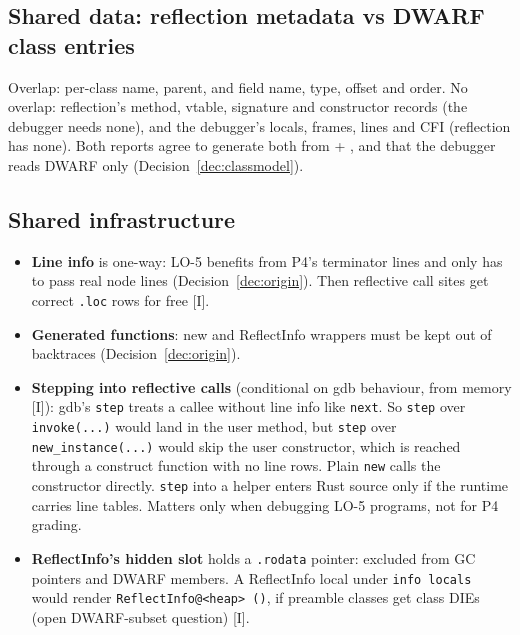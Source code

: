 \documentclass[10pt]{article}
\newcommand{\code}[1]{\texttt{\small #1}}
\newcommand{\mI}{\textsf{\scriptsize[I]}}
\begin{document}
\subsection{Shared data: reflection metadata vs DWARF class entries}\label{sec:ov-data}
Overlap: per-class name, parent, and field name, type, offset and order. No overlap: reflection's method, vtable, signature and constructor records (the debugger needs none), and the debugger's locals, frames, lines and CFI (reflection has none). Both reports agree to generate both from  + , and that the debugger reads DWARF only (Decision~\ref{dec:classmodel}).

\subsection{Shared infrastructure}\label{sec:ov-infra}
\begin{itemize}
\item \textbf{Line info} is one-way: LO-5 benefits from P4's terminator lines and only has to pass real node lines (Decision~\ref{dec:origin}). Then reflective call sites get correct \code{.loc} rows for free \mI.
\item \textbf{Generated functions}: new  and ReflectInfo wrappers must be kept out of backtraces (Decision~\ref{dec:origin}).
\item \textbf{Stepping into reflective calls} (conditional on gdb behaviour, from memory \mI): gdb's \code{step} treats a callee without line info like \code{next}. So \code{step} over \code{invoke(...)} would land in the user method, but \code{step} over \code{new\_instance(...)} would skip the user constructor, which is reached through a construct function with no line rows. Plain \code{new} calls the constructor directly. \code{step} into a  helper enters Rust source only if the runtime carries line tables. Matters only when debugging LO-5 programs, not for P4 grading.
\item \textbf{ReflectInfo's hidden slot} holds a \code{.rodata} pointer: excluded from GC pointers and DWARF members. A ReflectInfo local under \code{info locals} would render \code{ReflectInfo@<heap> ()}, if preamble classes get class DIEs (open DWARF-subset question) \mI.
\end{itemize}
\end{document}
